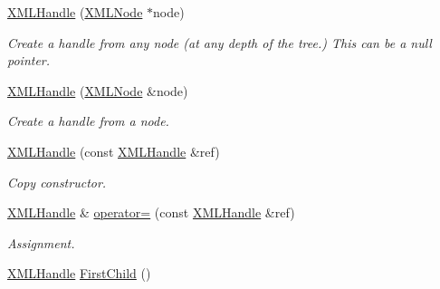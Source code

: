 \begin{DoxyCompactItemize}
\mbox{\label{classtinyxml2_1_1XMLHandle_a9c240a35c18f053509b4b97ddccd9793}} 
\hyperlink{classtinyxml2_1_1XMLHandle_a9c240a35c18f053509b4b97ddccd9793}{X\+M\+L\+Handle} (\hyperlink{classtinyxml2_1_1XMLNode}{X\+M\+L\+Node} $\ast$node)
\begin{DoxyCompactList}\small\item\em Create a handle from any node (at any depth of the tree.) This can be a null pointer. \end{DoxyCompactList}\item 
\mbox{\label{classtinyxml2_1_1XMLHandle_aa2edbc1c0d3e3e8259bd98de7f1cf500}} 
\hyperlink{classtinyxml2_1_1XMLHandle_aa2edbc1c0d3e3e8259bd98de7f1cf500}{X\+M\+L\+Handle} (\hyperlink{classtinyxml2_1_1XMLNode}{X\+M\+L\+Node} \&node)
\begin{DoxyCompactList}\small\item\em Create a handle from a node. \end{DoxyCompactList}\item 
\mbox{\label{classtinyxml2_1_1XMLHandle_afd8e01e6018c07347b8e6d80272466aa}} 
\hyperlink{classtinyxml2_1_1XMLHandle_afd8e01e6018c07347b8e6d80272466aa}{X\+M\+L\+Handle} (const \hyperlink{classtinyxml2_1_1XMLHandle}{X\+M\+L\+Handle} \&ref)
\begin{DoxyCompactList}\small\item\em Copy constructor. \end{DoxyCompactList}\item 
\mbox{\label{classtinyxml2_1_1XMLHandle_a75b908322bb4b83be3281b6845252b20}} 
\hyperlink{classtinyxml2_1_1XMLHandle}{X\+M\+L\+Handle} \& \hyperlink{classtinyxml2_1_1XMLHandle_a75b908322bb4b83be3281b6845252b20}{operator=} (const \hyperlink{classtinyxml2_1_1XMLHandle}{X\+M\+L\+Handle} \&ref)
\begin{DoxyCompactList}\small\item\em Assignment. \end{DoxyCompactList}\item 
\mbox{\label{classtinyxml2_1_1XMLHandle_a536447dc7f54c0cd11e031dad94795ae}} 
\hyperlink{classtinyxml2_1_1XMLHandle}{X\+M\+L\+Handle} \hyperlink{classtinyxml2_1_1XMLHandle_a536447dc7f54c0cd11e031dad94795ae}{First\+Child} ()

\end{DoxyCompactItemize}
